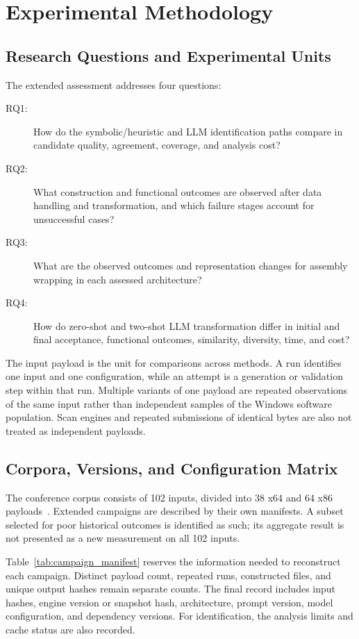\section{Experimental Methodology}\label{sec:methodology}
\subsection{Research Questions and Experimental Units}
The extended assessment addresses four questions:
\begin{description}
\item[RQ1:] How do the symbolic/heuristic and LLM identification paths
compare in candidate quality, agreement, coverage, and analysis cost?
\item[RQ2:] What construction and functional outcomes are observed
after data handling and transformation, and which failure stages
account for unsuccessful cases?
\item[RQ3:] What are the observed outcomes and representation changes
for assembly wrapping in each assessed architecture?
\item[RQ4:] How do zero-shot and two-shot LLM transformation differ
in initial and final acceptance, functional outcomes, similarity,
diversity, time, and cost?
\end{description}

The input payload is the unit for comparisons across methods. A run
identifies one input and one configuration, while an attempt is a
generation or validation step within that run. Multiple variants of
one payload are repeated observations of the same input rather than
independent samples of the Windows software population. Scan engines
and repeated submissions of identical bytes are also not treated as
independent payloads.

\subsection{Corpora, Versions, and Configuration Matrix}
The conference corpus consists of 102 inputs, divided into 38 x64 and
64 x86 payloads~\cite{zone_secrypt_2026}. Extended campaigns are described
by their own manifests. A subset selected for poor historical outcomes
is identified as such; its aggregate result is not presented as a new
measurement on all 102 inputs.

Table~\ref{tab:campaign_manifest} reserves the information needed to
reconstruct each campaign. Distinct payload count, repeated runs,
constructed files, and unique output hashes remain separate counts.
The final record includes input hashes, engine version or snapshot
hash, architecture, prompt version, model configuration, and dependency
versions. For identification, the analysis limits and cache status are
also recorded.

